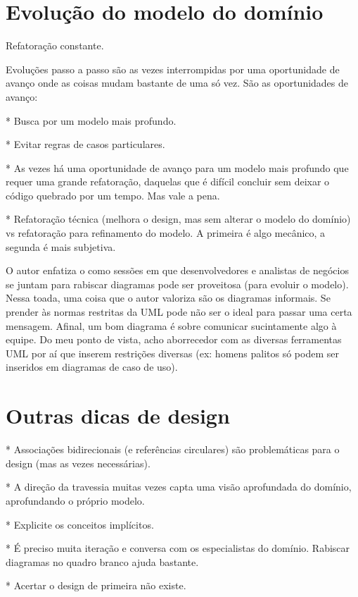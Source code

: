 \documentclass[a4paper, 12pt]{article}
\begin{document}
\section{Evolução do modelo do domínio}




Refatoração constante.

Evoluções passo a passo são as vezes interrompidas por uma oportunidade de avanço onde as coisas mudam bastante de uma só vez. São as oportunidades de avanço: 

* Busca por um modelo mais profundo.

* Evitar regras de casos particulares.

* As vezes há uma oportunidade de avanço para um modelo mais profundo que requer uma grande refatoração, daquelas que é difícil concluir sem deixar o código quebrado por um tempo. Mas vale a pena.

* Refatoração técnica (melhora o design, mas sem alterar o modelo do domínio) vs refatoração para refinamento do modelo. A primeira é algo mecânico, a segunda é mais subjetiva.

O autor enfatiza o como sessões em que desenvolvedores e analistas de negócios se juntam para rabiscar diagramas pode ser proveitosa (para evoluir o modelo). Nessa toada, uma coisa que o autor valoriza são os diagramas informais. Se prender às normas restritas da UML pode não ser o ideal para passar uma certa mensagem. Afinal, um bom diagrama é sobre comunicar sucintamente algo à equipe. Do meu ponto de vista, acho aborrecedor com as diversas ferramentas UML por aí que inserem restrições diversas (ex: homens palitos só podem ser inseridos em diagramas de caso de uso).

\section{Outras dicas de design}

* Associações bidirecionais (e referências circulares) são problemáticas para o design (mas as vezes necessárias).

* A direção da travessia muitas vezes capta uma visão aprofundada do domínio, aprofundando o próprio modelo. 

* Explicite os conceitos implícitos.

* É preciso muita iteração e conversa com os especialistas do domínio. Rabiscar diagramas no quadro branco ajuda bastante. 

* Acertar o design de primeira não existe.
\end{document}
